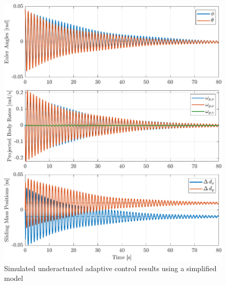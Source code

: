\begin{figure}[p!]
    \centering
    \includegraphics[width=\linewidth]{plots/adaptive_sim_success.pdf}
    \caption{Simulated underactuated adaptive control results using a simplified model}
    \label{fig:adaptive_sim_success}
\end{figure}

